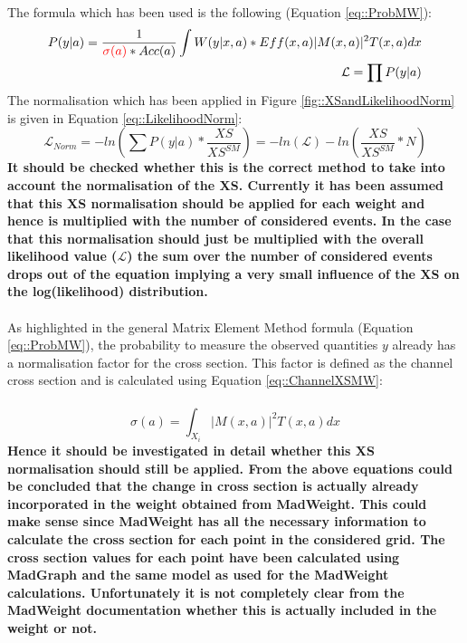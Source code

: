 The formula which has been used is the following (Equation \ref{eq::ProbMW}):
\begin{eqnarray}
 P(y \vert a) = \frac{1}{\textcolor{red}{\sigma(a)}*Acc(a)} \int W(y|x,a)*Eff(x,a) \vert M(x,a) \vert^{2} T(x,a) dx \label{eq::ProbMW}\\
 \mathcal{L} = \prod P(y \vert a)
\end{eqnarray}
The normalisation which has been applied in Figure \ref{fig::XSandLikelihoodNorm} is given in Equation \ref{eq::LikelihoodNorm}:
\begin{equation}\label{eq::LikelihoodNorm}
 \mathcal{L}_{Norm} = - ln(\sum P(y \vert a)*\frac{XS}{XS^{SM}}) = -ln(\mathcal{L}) - ln(\frac{XS}{XS^{SM}}*N)
\end{equation}
\textbf{It should be checked whether this is the correct method to take into account the normalisation of the XS. Currently it has been assumed that this XS normalisation should be applied for each weight and hence is multiplied with the number of considered events. In the case that this normalisation should just be multiplied with the overall likelihood value ($\mathcal{L}$) the sum over the number of considered events drops out of the equation implying a very small influence of the XS on the log(likelihood) distribution.}\\ \\

As highlighted in the general Matrix Element Method formula (Equation \ref{eq::ProbMW}), the probability to measure the observed quantities $y$ already has a normalisation factor for the cross section. This factor is defined as the channel cross section and is calculated using Equation \ref{eq::ChannelXSMW}:\\ \\
\begin{equation}\label{eq::ChannelXSMW}
 \sigma(a) = \int_{X_i} \vert M(x,a) \vert^{2} T(x,a) dx
\end{equation}
\textbf{Hence it should be investigated in detail whether this XS normalisation should still be applied. From the above equations could be concluded that the change in cross section is actually already incorporated in the weight obtained from MadWeight. This could make sense since MadWeight has all the necessary information to calculate the cross section for each point in the considered grid. The cross section values for each point have been calculated using MadGraph and the same model as used for the MadWeight calculations. Unfortunately it is not completely clear from the MadWeight documentation whether this is actually included in the weight or not.}

